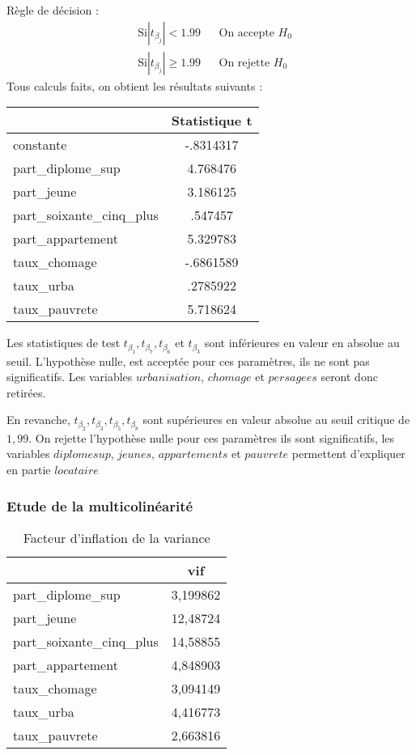 \documentclass[]{article}
\begin{document}
Règle de décision : 
\begin{align*}
    &\text{Si} |t_{\beta_j}| < 1.99 & &\text{On accepte } H_{0}\\
    &\text{Si} |t_{\beta_j}| \geq 1.99 & &\text{On rejette } H_{0}
\end{align*}
Tous calculs faits, on obtient les résultats suivants :
\begin{table}[H]
\centering
\begin{tabular}{l*{1}{c}}
\toprule
            &Statistique t\\
\midrule
constante      &   -.8314317\\
part\_diplome\_sup&    4.768476\\
part\_jeune  &    3.186125\\
part\_soixante\_cinq\_plus&     .547457\\
part\_appartement&    5.329783\\
taux\_chomage&   -.6861589\\
taux\_urba   &    .2785922\\
taux\_pauvrete&    5.718624\\
\bottomrule
\end{tabular}
\end{table}
Les statistiques de test $t_{\beta_1},t_{\beta_7},t_{\beta_6}$ et $t_{\beta_3}$ sont inférieures en valeur en absolue au seuil. L'hypothèse nulle, est
acceptée pour ces paramètres, ils ne sont pas significatifs. Les variables $urbanisation$, $chomage$ et $persagees$ seront donc retirées.

En revanche, $t_{\beta_2}, t_{\beta_3}, t_{\beta_5}, t_{\beta_8}$ sont supérieures en valeur absolue au seuil critique de $1,99$. On rejette l'hypothèse nulle pour ces paramètres
ils sont significatifs, les variables $diplomesup$, $jeunes$, $appartements$ et $pauvrete$ permettent d'expliquer en partie $locataire$
\subsubsection{Etude de la multicolinéarité}
\begin{table}[H]
\centering
\caption{Facteur d'inflation de la variance}
\begin{tabular}{l*{1}{c}}
\toprule
            &         vif\\
\midrule
part\_diplome\_sup&    3,199862\\
part\_jeune  &    12,48724\\
part\_soixante\_cinq\_plus&    14,58855\\
part\_appartement&    4,848903\\
taux\_chomage&    3,094149\\
taux\_urba   &    4,416773\\
taux\_pauvrete&    2,663816\\
\bottomrule
\end{tabular}
\end{table}
\end{document}
